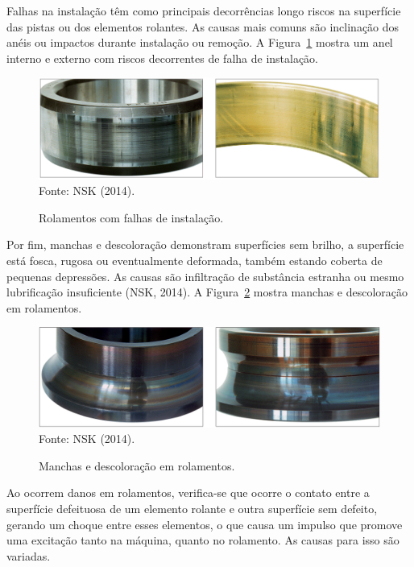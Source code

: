 \documentclass[
	12pt,				
	oneside,			
	a4paper,			
	english,			
	brazil,			
	]{abntex2ppgsi}
\begin{document}
Falhas na instalação têm como principais decorrências longo riscos na superfície das pistas ou dos elementos rolantes. As causas mais comuns são inclinação dos anéis ou impactos durante instalação ou remoção. A Figura~\ref{falha_instalacao_nsk} mostra um anel interno e externo com riscos decorrentes de falha de instalação.

\begin{figure}[H]
\centering
\caption {Rolamentos com falhas de instalação.}
\includegraphics[width=\textwidth,height=\textheight,keepaspectratio]{falha_instalacao_nsk} \\
Fonte: NSK (2014).
\label{falha_instalacao_nsk}
\end{figure}

Por fim, manchas e descoloração demonstram superfícies sem brilho, a superfície está fosca, rugosa ou eventualmente deformada, também estando coberta de pequenas depressões. As causas são infiltração de substância estranha ou mesmo lubrificação insuficiente (NSK, 2014). A Figura~\ref{manchas_nsk} mostra manchas e descoloração em rolamentos.

\begin{figure}[H]
\centering
\caption {Manchas e descoloração em rolamentos.}
\includegraphics[width=\textwidth,height=\textheight,keepaspectratio]{manchas_nsk} \\
Fonte: NSK (2014).
\label{manchas_nsk}
\end{figure}

Ao ocorrem danos em rolamentos, verifica-se que ocorre o contato entre a superfície defeituosa de um elemento rolante e outra superfície sem defeito, gerando um choque entre esses elementos, o que causa um impulso que promove uma excitação tanto na máquina, quanto no rolamento. As causas para isso são variadas.
\end{document}

